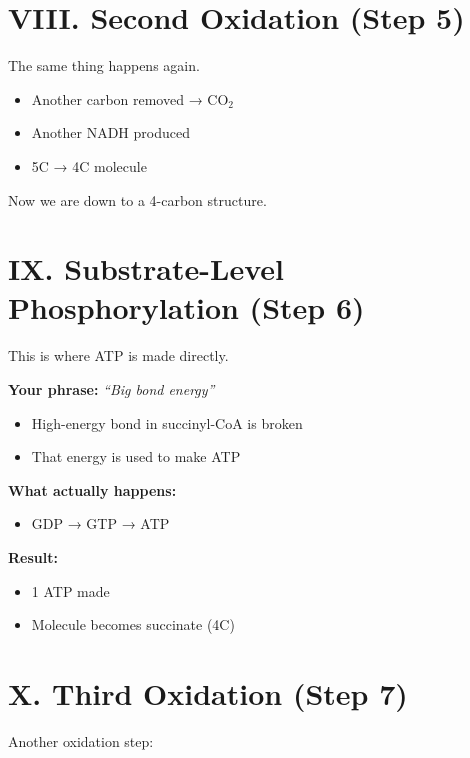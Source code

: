 \documentclass[9pt]{article}
\begin{document}

\section*{VIII. Second Oxidation (Step 5)}

The same thing happens again.

\begin{itemize}
\item Another carbon removed → CO$_2$
\item Another NADH produced
\item 5C → 4C molecule
\end{itemize}

Now we are down to a 4-carbon structure.


\section*{IX. Substrate-Level Phosphorylation (Step 6)}

This is where ATP is made directly.

\medskip
\textbf{Your phrase:}  
\textit{“Big bond energy”}

\begin{itemize}
\item High-energy bond in succinyl-CoA is broken
\item That energy is used to make ATP
\end{itemize}

\textbf{What actually happens:}
\begin{itemize}
\item GDP → GTP → ATP
\end{itemize}

\textbf{Result:}
\begin{itemize}
\item 1 ATP made
\item Molecule becomes succinate (4C)
\end{itemize}


\section*{X. Third Oxidation (Step 7)}

Another oxidation step:
\end{document}
